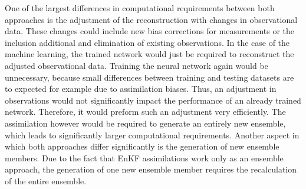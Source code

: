\documentclass[Masterarbeit.tex]{subfile}
\begin{document}
	
	
	One of the largest differences in computational requirements between both approaches is the adjustment of the reconstruction with changes in observational data. These changes could include new bias corrections for measurements or the inclusion additional and elimination of existing observations. In the case of the machine learning, the trained network would just be required to reconstruct the adjusted observational data. Training the neural network again would be unnecessary, because small differences between training and testing datasets are to expected for example due to assimilation biases. Thus, an adjustment in observations would not significantly impact the performance of an already trained network. Therefore, it would preform such an adjustment very efficiently. The assimilation however would be required to generate an entirely new ensemble, which leads to significantly larger computational requirements. Another aspect in which both approaches differ significantly is the generation of new ensemble members. Due to the fact that EnKF assimilations work only as an ensemble approach, the generation of one new ensemble member requires the recalculation of the entire ensemble. \\
	
\end{document}
